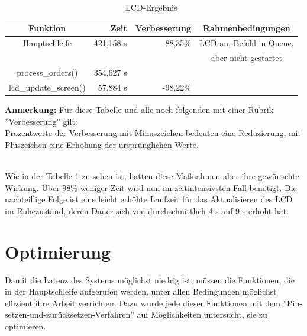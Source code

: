 \begin{table}[htb]
\begin{center}
	\begin{tabular}{|c||r|r|c|}
		\hline
		\textbf{Funktion} & \textbf{Zeit} & \textbf{Verbesserung} & \textbf{Rahmenbedingungen} \\ \hline \hline
		Hauptschleife & 421,158 \textmu{}s & -88,35\% & LCD an, Befehl in Queue,\\
		& & & aber nicht gestartet \\ \hline
		process\_orders() & 354,627 \textmu{}s & & \\ \hline
		lcd\_update\_screen() & 57,884 \textmu{}s & -98,22\% & \\ \hline
	\end{tabular}
	\caption{\label{lcd_opt} LCD-Ergebnis}
\end{center}
\textbf{Anmerkung:} Für diese Tabelle und alle noch folgenden mit einer Rubrik ''Verbesserung'' gilt:\\
Prozentwerte der Verbesserung mit Minuszeichen bedeuten eine Reduzierung, mit Pluszeichen eine Erhöhung
der ursprünglichen Werte.\\
\\
\end{table}
Wie in der Tabelle \ref{lcd_opt} zu sehen ist, hatten diese Maßnahmen aber ihre gewünschte Wirkung. Über 98\% weniger Zeit
wird nun im zeitintensivsten Fall benötigt. Die nachteillige Folge ist eine leicht erhöhte Laufzeit für das
Aktualisieren des LCD im Ruhezustand, deren Dauer sich von durchschnittlich 4 \textmu{}s auf 9 \textmu{}s erhöht hat.

\section{Optimierung}
Damit die Latenz des Systems möglichst niedrig ist, müssen die Funktionen, die in der Hauptschleife aufgerufen werden,
unter allen Bedingungen möglichst effizient ihre Arbeit verrichten. Dazu wurde jede dieser Funktionen mit dem 
''Pin-setzen-und-zurücksetzen-Verfahren'' auf Möglichkeiten untersucht, sie zu optimieren.

